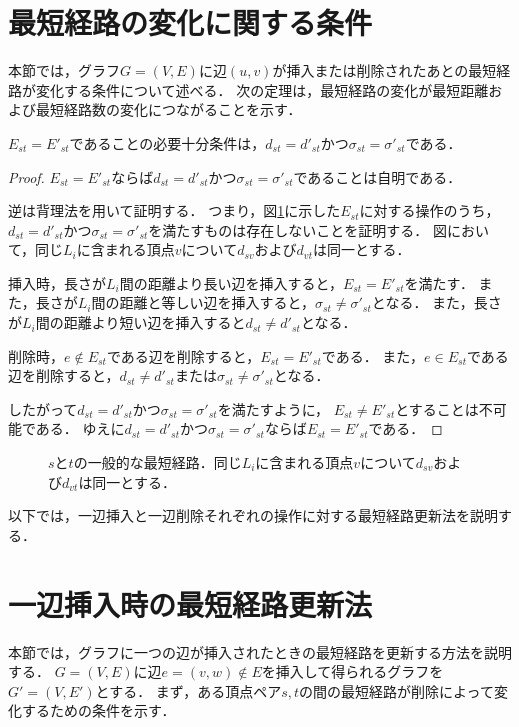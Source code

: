 \section{最短経路の変化に関する条件}
本節では，グラフ$G=(V,E)$に辺$(u,v)$が挿入または削除されたあとの最短経路が変化する条件について述べる．
次の定理は，最短経路の変化が最短距離および最短経路数の変化につながることを示す．
\begin{theorem}
  \label{thm:condition-of-invariability-of-shortest-path}
  $E_{st}=E'_{st}$であることの必要十分条件は，$d_{st}=d'_{st}$かつ$\sigma_{st}=\sigma'_{st}$である．
\end{theorem}
\begin{proof}
  $E_{st}=E'_{st}$ならば$d_{st}=d'_{st}$かつ$\sigma_{st}=\sigma'_{st}$であることは自明である．

  逆は背理法を用いて証明する．
  つまり，図\ref{fig:general-shortest-paths-weighted}に示した$E_{st}$に対する操作のうち，
  $d_{st}=d'_{st}$かつ$\sigma_{st}=\sigma'_{st}$を満たすものは存在しないことを証明する．
  図において，同じ$L_i$に含まれる頂点$v$について$d_{sv}$および$d_{vt}$は同一とする．

  挿入時，長さが$L_i$間の距離より長い辺を挿入すると，$E_{st}=E'_{st}$を満たす．
  また，長さが$L_i$間の距離と等しい辺を挿入すると，$\sigma_{st}\neq\sigma'_{st}$となる．
  また，長さが$L_i$間の距離より短い辺を挿入すると$d_{st}\neq d'_{st}$となる．

  削除時，$e\notin E_{st}$である辺を削除すると，$E_{st}=E'_{st}$である．
  また，$e\in E_{st}$である辺を削除すると，$d_{st}\neq d'_{st}$または$\sigma_{st}\neq\sigma'_{st}$となる．

  したがって$d_{st}=d'_{st}$かつ$\sigma_{st}=\sigma'_{st}$を満たすように，
  $E_{st}\neq E'_{st}$とすることは不可能である．
  ゆえに$d_{st}=d'_{st}$かつ$\sigma_{st}=\sigma'_{st}$ならば$E_{st}=E'_{st}$である．
\end{proof}
\begin{figure}
  \centering
  \def\svgwidth{.5\columnwidth}
  
  \caption{$s$と$t$の一般的な最短経路．同じ$L_i$に含まれる頂点$v$について$d_{sv}$および$d_{vt}$は同一とする．}
  \label{fig:general-shortest-paths-weighted}
\end{figure}

以下では，一辺挿入と一辺削除それぞれの操作に対する最短経路更新法を説明する．

\section{一辺挿入時の最短経路更新法}
\label{sect:update-apsp-on-insert}
本節では，グラフに一つの辺が挿入されたときの最短経路を更新する方法を説明する．
$G=(V,E)$に辺$e=(v,w) \not\in E$を挿入して得られるグラフを$G'=(V,E')$とする．
まず，ある頂点ペア$s,t$の間の最短経路が削除によって変化するための条件を示す．

